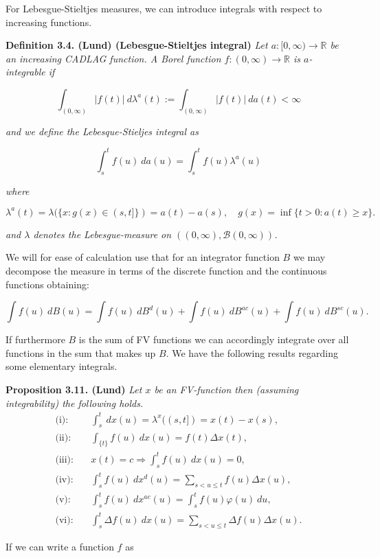 \documentclass[a4paper,12pt,openany]{book}
\begin{document}
For Lebesgue-Stieltjes measures, we can introduce integrals with respect to increasing functions.

\textbf{Definition 3.4. (Lund) (Lebesgue-Stieltjes integral)} \emph{Let \(a : [0,\infty) \to \mathbb R\) be an increasing CADLAG function. A Borel function \(f:(0,\infty)\to\mathbb R\) is \(a\)-integrable if}

\[
\int_{(0,\infty)}\vert f(t)\vert\ d\lambda ^a(t):=\int_{(0,\infty)}\vert f(t)\vert\ da(t)<\infty
\]

\emph{and we define the Lebesque-Stieljes integral as}

\[
\int_s^tf(u)\ da(u)=\int_s^t f(u)\lambda^a(u)
\]

\emph{where}

\[
\lambda^a(t)=\lambda(\{x : g(x)\in (s,t]\})=a(t)-a(s),\quad g(x)=\inf\{t>0 : a(t)\ge x\}.
\]

\emph{and \(\lambda\) denotes the Lebesgue-measure on \(((0,\infty),\mathcal B(0,\infty))\).}

We will for ease of calculation use that for an integrator function \(B\) we may decompose the measure in terms of the discrete function and the continuous functions obtaining:

\[
\int f(u)\ dB(u)=\int f(u)\ dB^d(u)+\int f(u)\ dB^{ac}(u)+\int f(u)\ dB^{sc}(u).
\]

If furthermore \(B\) is the sum of FV functions we can accordingly integrate over all functions in the sum that makes up \(B\). We have the following results regarding some elementary integrals.

\textbf{Proposition 3.11. (Lund)} \emph{Let \(x\) be an FV-function then (assuming integrability) the following holds.}
\begin{align*}
\text{(i):}&\quad\int_s^t\ dx(u)=\lambda^x((s,t])=x(t)-x(s),\\
\text{(ii):}&\quad \int_{\{t\}}f(u)\ dx(u)=f(t)\Delta x(t),\\
\text{(iii):}&\quad x(t)=c\Longrightarrow \int_s^t f(u)\ dx(u)=0,\\
\text{(iv):}&\quad \int_s^t f(u)\ dx^d(u)=\sum_{s< u\le t} f(u)\Delta x(u),\\
\text{(v):}&\quad \int_s^t f(u)\ dx^{ac}(u)=\int_s^t f(u)\varphi(u)\ du,\\
\text{(vi):}&\quad \int_s^t \Delta f(u)\ dx(u)=\sum_{s< u\le t} \Delta f(u)\Delta x(u).
\end{align*}

If we can write a function \(f\) as
\end{document}
